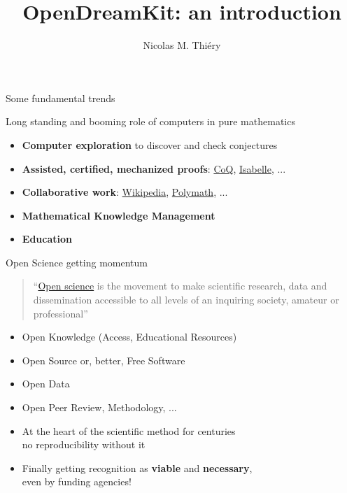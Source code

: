 \documentclass{beamer}
\author{Nicolas M. Thiéry}
\title{OpenDreamKit: an introduction}
\begin{document}
\begin{frame}
  \titlepage

\end{frame}

\begin{frame}{Some fundamental trends}\label{some-fundamental-trends}
\end{frame}

\begin{frame}{Long standing and booming role of computers in pure
    mathematics}
  \label{long-standing-and-booming-role-of-computers-in-pure-mathematics}


  \begin{itemize}
  \item \textbf{Computer exploration} to discover and check conjectures
  \item \textbf{Assisted, certified, mechanized proofs}: \href{https://coq.inria.fr/}{CoQ}, \href{https://isabelle.in.tum.de/}{Isabelle}, ...
  \item \textbf{Collaborative work}:
    \href{https://www.wikipedia.org/}{Wikipedia},
    \href{https://polymathprojects.org/}{Polymath}, ...
  \item \textbf{Mathematical Knowledge Management}
  \item \textbf{Education}
  \end{itemize}
\end{frame}

\begin{frame}{Open Science getting momentum}
  \begin{quote}
    ``\href{https://en.wikipedia.org/wiki/Open_science}{Open science}
    is the movement to make scientific research, data and
    dissemination accessible to all levels of an inquiring society,
    amateur or professional''
  \end{quote}

  \begin{itemize}
  \item Open Knowledge (Access, Educational Resources)
  \item Open Source or, better, Free Software
  \item Open Data
  \item Open Peer Review, Methodology, ...
  \end{itemize}

  \begin{itemize}
  \item At the heart of the scientific method for centuries\\
    no reproducibility without it
    \pause
  \item Finally getting recognition as \textbf{viable} and \textbf{necessary},\\
    even by funding agencies!
  \end{itemize}
\end{frame}
\end{document}
